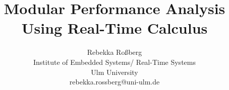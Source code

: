 \documentclass[conference,a4paper]{IEEEtran}
\title{Modular Performance Analysis \\ Using Real-Time Calculus}
\author{Rebekka Roßberg\\Institute of Embedded Systems/ Real-Time Systems\\Ulm University\\rebekka.rossberg@uni-ulm.de}
\begin{document}
\maketitle

\thispagestyle{plain}
\pagestyle{plain}

\begin{tcolorbox}[title=Abstract]
  
\end{tcolorbox}












\begin{appendices}
  
\end{appendices}



\end{document}

